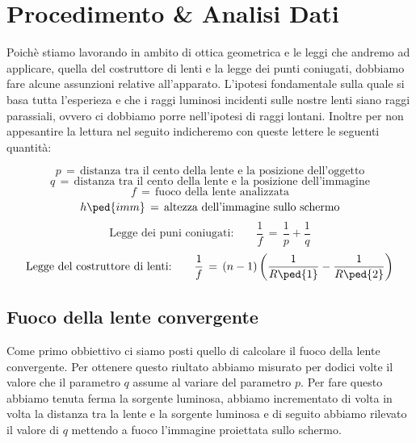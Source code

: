 \section{Procedimento \& Analisi Dati}

Poichè stiamo lavorando in ambito di ottica geometrica e le leggi che andremo ad applicare, quella del costruttore di lenti e la legge dei punti coniugati, dobbiamo fare alcune assunzioni relative all'apparato.
L'ipotesi fondamentale sulla quale si basa tutta l'esperieza e che i raggi luminosi incidenti sulle nostre lenti siano raggi parassiali, ovvero ci dobbiamo porre nell'ipotesi di raggi lontani.
Inoltre per non appesantire la lettura nel seguito indicheremo con queste lettere le seguenti quantità:


\begin{equation*}
	p \,=\, \text{distanza tra il cento della lente e la posizione dell'oggetto}
\end{equation*}
\begin{equation*}
	q \,=\, \text{distanza tra il cento della lente e la posizione dell'immagine}
\end{equation*}
\begin{equation*}
	f \,=\, \text{fuoco della lente analizzata}
\end{equation*}
\begin{equation*}
	h \ped{imm} \,=\, \text{altezza dell'immagine sullo schermo}
\end{equation*}
\begin{equation}
	\text{Legge dei puni coniugati:} \qquad \frac{1}{f} \,=\, \frac{1}{p} + \frac{1}{q}
\end{equation}
\begin{equation}
	\text{Legge del costruttore di lenti:} \qquad \frac{1}{f} \,=\, (n-1)\left(\frac{1}{R\ped{1}}-\frac{1}{R\ped{2}}\right)
\end{equation}


\subsection{Fuoco della lente convergente}

Come primo obbiettivo ci siamo posti quello di calcolare il fuoco della lente convergente. Per ottenere questo riultato abbiamo misurato per dodici volte il valore che il parametro $q$ assume al variare del parametro $p$. Per fare questo abbiamo tenuta ferma la sorgente luminosa, abbiamo incrementato di volta in volta la distanza tra la lente e la sorgente luminosa e di seguito abbiamo rilevato il valore di $q$ mettendo a fuoco l'immagine proiettata sullo schermo.

